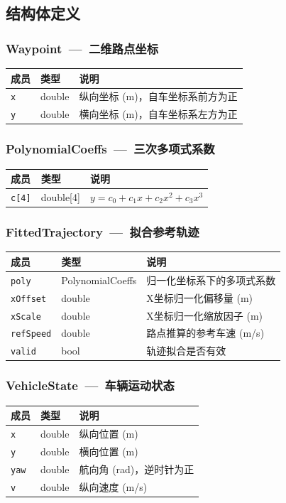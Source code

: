 \documentclass[a4paper,10pt]{article}
\begin{document}
\subsection{结构体定义}

\subsubsection{Waypoint~---~二维路点坐标}
\begin{longtable}{|L{3.5cm}|C{2cm}|L{9.5cm}|}
\hline
\textbf{成员} & \textbf{类型} & \textbf{说明} \\
\hline
\texttt{x} & double & 纵向坐标 (m)，自车坐标系前方为正 \\
\hline
\texttt{y} & double & 横向坐标 (m)，自车坐标系左方为正 \\
\hline
\end{longtable}

\subsubsection{PolynomialCoeffs~---~三次多项式系数}
\begin{longtable}{|L{3.5cm}|C{2cm}|L{9.5cm}|}
\hline
\textbf{成员} & \textbf{类型} & \textbf{说明} \\
\hline
\texttt{c[4]} & double[4] & $y = c_0 + c_1 x + c_2 x^2 + c_3 x^3$ \\
\hline
\end{longtable}

\subsubsection{FittedTrajectory~---~拟合参考轨迹}
\begin{longtable}{|L{3.5cm}|C{2cm}|L{9.5cm}|}
\hline
\textbf{成员} & \textbf{类型} & \textbf{说明} \\
\hline
\texttt{poly} & PolynomialCoeffs & 归一化坐标系下的多项式系数 \\
\hline
\texttt{xOffset} & double & X坐标归一化偏移量 (m) \\
\hline
\texttt{xScale} & double & X坐标归一化缩放因子 (m) \\
\hline
\texttt{refSpeed} & double & 路点推算的参考车速 (m/s) \\
\hline
\texttt{valid} & bool & 轨迹拟合是否有效 \\
\hline
\end{longtable}

\subsubsection{VehicleState~---~车辆运动状态}
\begin{longtable}{|L{3.5cm}|C{2cm}|L{9.5cm}|}
\hline
\textbf{成员} & \textbf{类型} & \textbf{说明} \\
\hline
\texttt{x} & double & 纵向位置 (m) \\
\hline
\texttt{y} & double & 横向位置 (m) \\
\hline
\texttt{yaw} & double & 航向角 (rad)，逆时针为正 \\
\hline
\texttt{v} & double & 纵向速度 (m/s) \\
\hline
\end{longtable}
\end{document}
